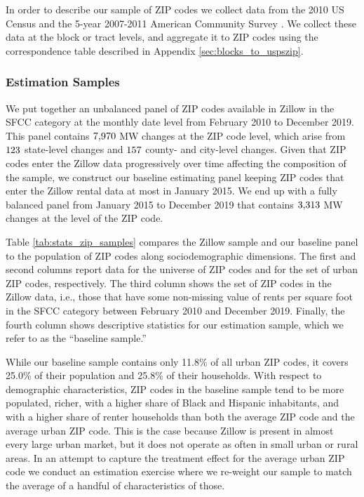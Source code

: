 In order to describe our sample of ZIP codes we collect data from the 
2010 US Census \parencite{CensusDecennial} and
the 5-year 2007-2011 American Community Survey \parencite[ACS;][]{CensusACS}.
We collect these data at the block or tract levels, and aggregate it to ZIP codes
using the correspondence table described in Appendix \ref{sec:blocks_to_uspszip}.

\subsubsection{Estimation Samples}\label{sec:data_final_panel}

We put together an unbalanced panel of ZIP codes available in Zillow in the SFCC 
category at the monthly date level from February 2010 to December 2019.
This panel contains $\textnormal{7,970}$ MW changes at the ZIP code level, 
which arise from $\textnormal{123}$ state-level changes and 
$\textnormal{157}$ county- and city-level changes.
Given that ZIP codes enter the Zillow data progressively over time affecting 
the composition of the sample,
we construct our baseline estimating panel keeping ZIP codes that enter the 
Zillow rental data at most in January 2015.
We end up with a fully balanced panel from January 2015 to December 2019
that contains $\textnormal{3,313}$ MW changes at the level of the ZIP code.

Table \ref{tab:stats_zip_samples} compares the Zillow sample and our baseline 
panel to the population of ZIP codes along sociodemographic dimensions. 
The first and second columns report data for the universe of ZIP codes and 
for the set of urban ZIP codes, respectively.
The third column shows the set of ZIP codes in the Zillow data, i.e., those 
that have some non-missing value of rents per square foot in the SFCC category 
between February 2010 and December 2019.
Finally, the fourth column shows descriptive statistics for our estimation 
sample, which we refer to as the ``baseline sample.''

While our baseline sample contains only 11.8\% of all urban ZIP codes, it covers
25.0\% of their population and 25.8\% of their households.
With respect to demographic characteristics, ZIP codes in the baseline sample 
tend to be more populated, richer, with a higher share of Black and Hispanic 
inhabitants, and with a higher share of renter households than both 
the average ZIP code and the average urban ZIP code.
This is the case because Zillow is present in almost every large urban market, 
but it does not operate as often in small urban or rural areas.
In an attempt to capture the treatment effect for the average urban ZIP code 
we conduct an estimation exercise where we re-weight our sample to match the 
average of a handful of characteristics of those.

